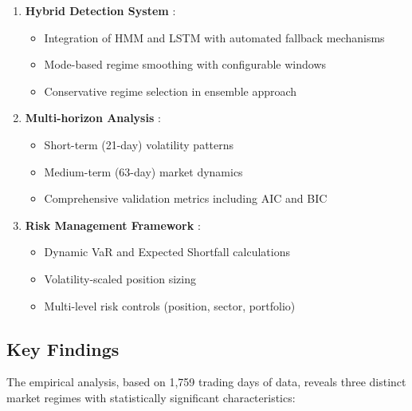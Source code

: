 \begin{enumerate}
    \item \textbf{Hybrid Detection System} \citep{hochreiter1997long}:
    \begin{itemize}
        \item Integration of HMM and LSTM with automated fallback mechanisms
        \item Mode-based regime smoothing with configurable windows
        \item Conservative regime selection in ensemble approach
    \end{itemize}

    \item \textbf{Multi-horizon Analysis} \citep{guidolin2011regime}:
    \begin{itemize}
        \item Short-term (21-day) volatility patterns
        \item Medium-term (63-day) market dynamics
        \item Comprehensive validation metrics including AIC and BIC
    \end{itemize}

    \item \textbf{Risk Management Framework} \citep{artzner1999coherent}:
    \begin{itemize}
        \item Dynamic VaR and Expected Shortfall calculations
        \item Volatility-scaled position sizing
        \item Multi-level risk controls (position, sector, portfolio)
    \end{itemize}
\end{enumerate}

\subsection{Key Findings}
The empirical analysis, based on 1,759 trading days of data, reveals three distinct market regimes with statistically significant characteristics:


